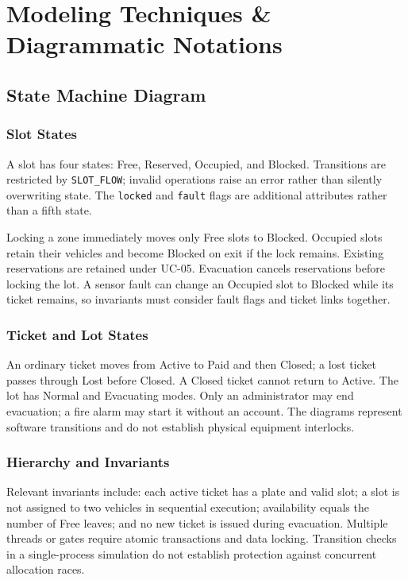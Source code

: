 \chapter{Modeling Techniques \& Diagrammatic Notations}
\section{State Machine Diagram}
\subsection{Slot States}
A slot has four states: Free, Reserved, Occupied, and Blocked. Transitions are restricted by \texttt{SLOT\_FLOW}; invalid operations raise an error rather than silently overwriting state. The \texttt{locked} and \texttt{fault} flags are additional attributes rather than a fifth state.

Locking a zone immediately moves only Free slots to Blocked. Occupied slots retain their vehicles and become Blocked on exit if the lock remains. Existing reservations are retained under UC-05. Evacuation cancels reservations before locking the lot. A sensor fault can change an Occupied slot to Blocked while its ticket remains, so invariants must consider fault flags and ticket links together.

\subsection{Ticket and Lot States}
An ordinary ticket moves from Active to Paid and then Closed; a lost ticket passes through Lost before Closed. A Closed ticket cannot return to Active. The lot has Normal and Evacuating modes. Only an administrator may end evacuation; a fire alarm may start it without an account. The diagrams represent software transitions and do not establish physical equipment interlocks.

\subsection{Hierarchy and Invariants}

Relevant invariants include: each active ticket has a plate and valid slot; a slot is not assigned to two vehicles in sequential execution; availability equals the number of Free leaves; and no new ticket is issued during evacuation. Multiple threads or gates require atomic transactions and data locking. Transition checks in a single-process simulation do not establish protection against concurrent allocation races.

